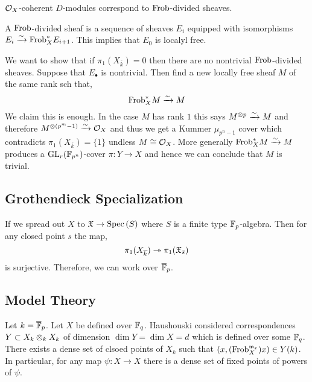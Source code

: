 \documentclass[12pt]{article}
\begin{document}
\begin{prop}
$\mathcal{O}_{X}$-coherent $D$-modules correspond to $\mathrm{Frob}$-divided sheaves.
\end{prop}

\begin{rmk}
A $\mathrm{Frob}$-divided sheaf is a sequence of sheaves $E_i$ equipped with isomorphisms $E_i \xrightarrow{\sim} \mathrm{Frob}^*_X E_{i+1}$. This implies that $E_0$ is localyl free. 
\end{rmk}

\begin{rmk}
We want to show that if $\pi_1(X_{\overline{k}}) = 0$ then there are no nontrivial $\mathrm{Frob}$-divided sheaves. Suppose that $E_\bullet$ is nontrivial. Then find a new locally free sheaf $M$ of the same rank sch that,
\[ \mathrm{Frob}_X^* M \xrightarrow{\sim} M \]
We claim this is enough. In the case $M$ has rank $1$ this says $M^{\otimes p} \xrightarrow{\sim} M$ and therefore $M^{\otimes (p^m - 1)} \xrightarrow{\sim} \mathcal{O}_{X}$ and thus we get a Kummer $\mu_{p^{n}-1}$ cover which contradicts $\pi_1(X_{\overline{k}}) = \{ 1 \}$ undless $M \cong \mathcal{O}_{X}$. More generally $\mathrm{Frob}_X^* M \xrightarrow{\sim} M$ produces a $\mathrm{GL}_r(\mathbb{F}_{p^n})$-cover $\pi : Y \to X$ and hence we can conclude that $M$ is trivial.
\end{rmk}

\subsection{Grothendieck Specialization}

\newcommand{\X}{\mathfrak{X}}

If we spread out $X$ to $\X \to \Spec{S}$ where $S$ is a finite type $\mathbb{F}_p$-algebra. Then for any closed point $s$ the map,
\[ \pi_1(X_{\overline{k}}) \onto \pi_1(\X_{\bar{s}}) \]
is surjective. Therefore, we can work over $\overline{\mathbb{F}}_p$.

\subsection{Model Theory}

Let $k = \overline{\mathbb{F}}_p$. Let $X$ be defined over $\mathbb{F}_q$. Haushouski considered correspondences $Y \subset X_{k} \otimes_k X_k$ of dimension $\dim{Y} = \dim{X} = d$ which is defined over some $\mathbb{F}_q$. There exists a dense set of clsoed points of $X_{k}$ such that $(x, (\mathrm{Frob}_X^{\mathfrak{m}_x}) x) \in Y(k)$. 
\bigskip\\
In particular, for any map $\psi : X \to X$ there is a dense set of fixed points of powers of $\psi$. 
\end{document}
